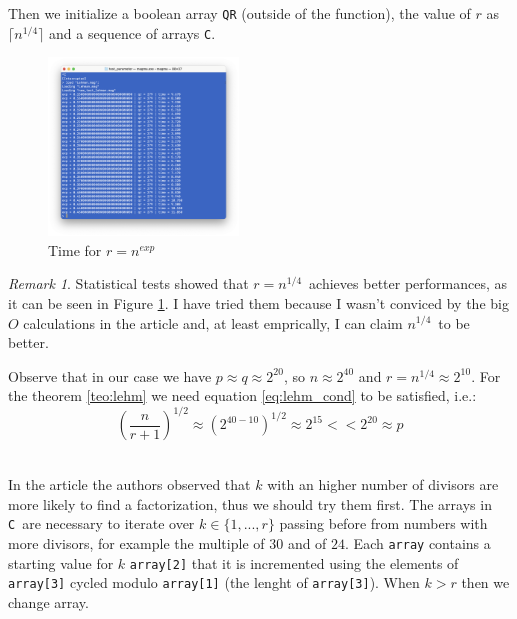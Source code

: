 \documentclass{article}
\theoremstyle{plain}
\theoremstyle{remark}
\newtheorem{rem}{Remark}
\theoremstyle{definition}
\begin{document}
Then we initialize a boolean array \texttt{QR} (outside of the function), the value of $r$ as $\lceil n^{1/4} \rceil$ and a sequence of arrays \texttt{C}. 

\begin{figure}
	\centering
	\label{fig:r_choice}
	\includegraphics[width=0.45\textwidth]{r_coiche.png}
  	\caption{Time for $r = n^{exp }$ }
\end{figure}

\begin{rem}
	Statistical tests showed that $r = n^{1/4}$ achieves better performances, as it can be seen in Figure \ref{fig:r_choice}. I have tried them because I wasn't conviced by the big $O$ calculations in the article and, at least emprically, I can claim $n^{1/4}$ to be better. 

	Observe that in our case we have $p \approx q \approx 2^{20}$, so $n\approx 2^{40}$ and $r = n^{1/4} \approx 2^{10}$. For the theorem \ref{teo:lehm} we need equation \ref{eq:lehm_cond} to be satisfied, i.e.:
	\begin{equation*}
		\left(\frac{n}{r+1}\right)^{1/2} \approx \left( 2^{40-10} \right)^{1/2} \approx 2^{15} << 2^{20} \approx p
	\end{equation*} 
\end{rem}

In the article the authors observed that $k$ with an higher number of divisors are more likely to find a factorization, thus we should try them first. 
The arrays in \texttt{C} are necessary to iterate over $k \in \{1,...,r\}$ passing before from numbers with more divisors, for example the multiple of $30$ and of $24$. Each \verb|array| contains a starting value for $k$ \verb|array[2]| that it is incremented using the elements of \verb|array[3]| cycled modulo \verb|array[1]| (the lenght of \verb|array[3]|). When $k > r$ then we change array. 
\end{document}
